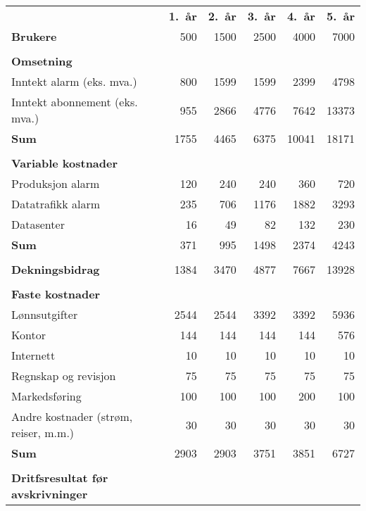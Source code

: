 \begin{table}
  \begin{tabular}{lrrrrr}
   & \textbf{1.~år} & \textbf{2.~år} & \textbf{3.~år} & \textbf{4.~år} & \textbf{5.~år} \\
    \textbf{Brukere} & 500 & 1500 & 2500 & 4000 & 7000 \\
    \\
    \textbf{Omsetning} \\
    Inntekt alarm   (eks. mva.)      &  800 & 1599 & 1599 &  2399 &  4798 \\
    Inntekt abonnement (eks. mva.)   &  955 & 2866 & 4776 &  7642 & 13373 \\
    \textbf{Sum}                     & 1755 & 4465 & 6375 & 10041 & 18171 \\
    \\
    \textbf{Variable kostnader} \\
    Produksjon alarm                &   120 &  240 &  240 &   360 &   720 \\
    Datatrafikk alarm               &   235 &  706 & 1176 &  1882 &  3293 \\
    Datasenter                      &    16 &   49 &   82 &   132 &   230 \\
    \textbf{Sum}                    &   371 &  995 & 1498 &  2374 &  4243 \\
    \\
    \textbf{Dekningsbidrag}         &  1384 & 3470 & 4877 &  7667 & 13928 \\
    \hline
    \\
    \textbf{Faste kostnader} \\
    Lønnsutgifter                   &  2544 & 2544 & 3392 &  3392 &  5936 \\
    Kontor                          &   144 &  144 &  144 &   144 &   576 \\
    Internett                       &    10 &   10 &   10 &    10 &    10 \\
    Regnskap og revisjon            &    75 &   75 &   75 &    75 &    75 \\
    Markedsføring                   &   100 &  100 &  100 &   200 &   100 \\
    Andre kostnader
    (strøm, reiser, m.m.)           &    30 &   30 &   30 &    30 &    30 \\
    \textbf{Sum}                    &  2903 & 2903 & 3751 &  3851 &  6727 \\
    \\
    \textbf{Dritfsresultat før avskrivninger}

\end{tabular}
\end{table}
